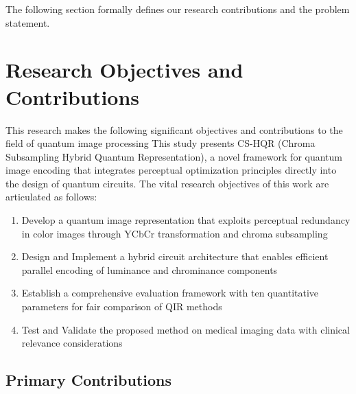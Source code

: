 \documentclass[11pt,a4paper]{article}
\begin{document}
The following section formally defines our research contributions and the problem statement.

\section{Research Objectives and Contributions}
\label{sec:contribution}

This research makes the following significant objectives and contributions to the field of quantum image processing
This study presents CS-HQR (Chroma Subsampling Hybrid Quantum Representation), a novel framework for quantum image encoding that integrates perceptual optimization principles directly into the design of quantum circuits. The vital research objectives of this work are articulated as follows:

\begin{enumerate}[label=\textbf{O\arabic*:}]
    \item Develop a quantum image representation that exploits perceptual redundancy in color images through YCbCr transformation and chroma subsampling
    \item Design and Implement a hybrid circuit architecture that enables efficient parallel encoding of luminance and chrominance components
    \item Establish a comprehensive evaluation framework with ten quantitative parameters for fair comparison of QIR methods
    \item Test and Validate the proposed method on medical imaging data with clinical relevance considerations
\end{enumerate}


\subsection{Primary Contributions}
\end{document}
